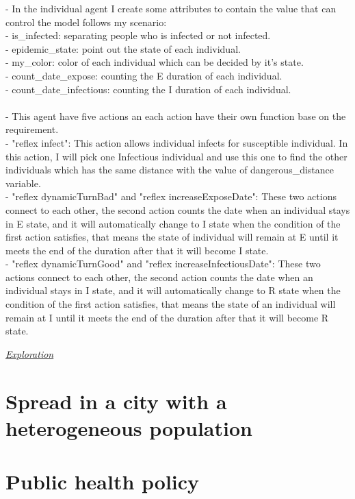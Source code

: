 \documentclass{article}
\begin{document}
- In the individual agent I create some attributes to contain the value that can control the model follows my scenario:
\\- is\_infected: separating people who is infected or not infected.
\\- epidemic\_state: point out the state of each individual.
\\-	my\_color: color of each individual which can be decided by it's state.
\\-	count\_date\_expose: counting the E duration of each individual.
\\- count\_date\_infectious: counting the I duration of each individual.
\\\\
- This agent have five actions an each action have their own function base on the requirement.
\\- "reflex infect": This action allows individual infects for susceptible individual. In this action, I will pick one Infectious individual and use this one to find the other individuals which has the same distance with the value of dangerous\_distance variable.
\\- "reflex dynamicTurnBad" and "reflex increaseExposeDate": These two actions connect to each other, the second action counts the date when an individual stays in E state, and it will automatically change to I state when the condition of the first action satisfies, that means the state of individual will remain at E until it meets the end of the duration after that it will become I state.
\\- "reflex dynamicTurnGood" and "reflex increaseInfectiousDate": These two actions connect to each other, the second action counts the date when an individual stays in I state, and it will automatically change to R state when the condition of the first action satisfies, that means the state of an individual will remain at I until it meets the end of the duration after that it will become R state.



\underline{\emph{Exploration}}


\section{Spread in a city with a heterogeneous population}

\section{Public health policy}
\end{document}
